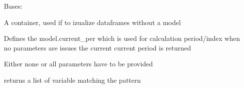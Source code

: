\documentclass[letterpaper,10pt,english]{sphinxmanual}
\begin{document}

\begin{fulllineitems}
\label{\detokenize{vis/modelvis:modelvis.container}}
\pysigstartsignatures
{}
\pysigstopsignatures
\sphinxAtStartPar
Bases: 

\sphinxAtStartPar
A container, used if to izualize dataframes without a model

\begin{fulllineitems}
\label{\detokenize{vis/modelvis:modelvis.container.smpl}}
\pysigstartsignatures
{}
\pysigstopsignatures
\sphinxAtStartPar
Defines the model.current\_per which is used for calculation period/index
when no parameters are issues the current current period is returned

\sphinxAtStartPar
Either none or all parameters have to be provided

\end{fulllineitems}


\begin{fulllineitems}
\label{\detokenize{vis/modelvis:modelvis.container.vlist}}
\pysigstartsignatures
{}
\pysigstopsignatures
\sphinxAtStartPar
returns a list of variable matching the pattern

\end{fulllineitems}


\end{fulllineitems}

\end{document}
